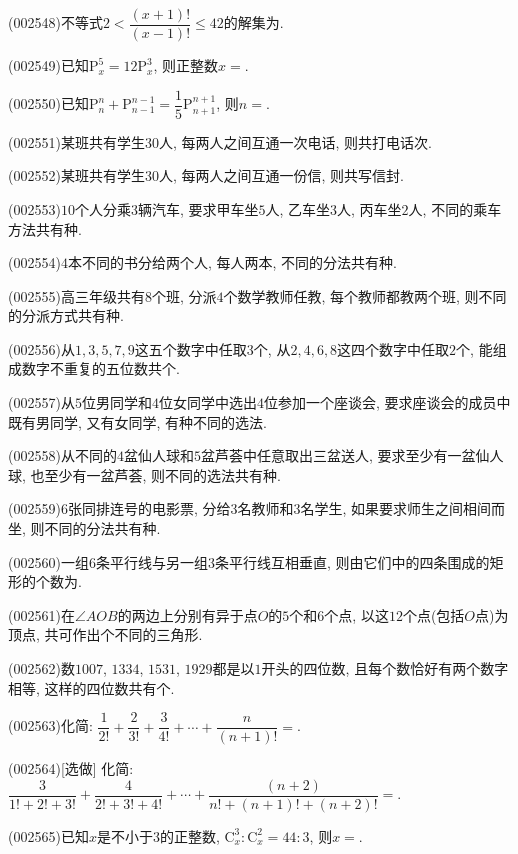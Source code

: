 \item (002548)不等式$2<\dfrac{(x+1)!}{(x-1)!}\le 42$的解集为.
\item (002549)已知$\mathrm{P}_x^5=12\mathrm{P}_x^3$, 则正整数$x=$.
\item (002550)已知$\mathrm{P}_n^n+\mathrm{P}_{n-1}^{n-1}=\dfrac{1}{5}\mathrm{P}_{n+1}^{n+1}$, 则$n=$.
\item (002551)某班共有学生$30$人, 每两人之间互通一次电话, 则共打电话次.
\item (002552)某班共有学生$30$人, 每两人之间互通一份信, 则共写信封.
\item (002553)$10$个人分乘$3$辆汽车, 要求甲车坐$5$人, 乙车坐$3$人, 丙车坐$2$人, 不同的乘车方法共有种.
\item (002554)$4$本不同的书分给两个人, 每人两本, 不同的分法共有种.
\item (002555)高三年级共有$8$个班, 分派$4$个数学教师任教, 每个教师都教两个班, 则不同的分派方式共有种.
\item (002556)从$1,3,5,7,9$这五个数字中任取$3$个, 从$2,4,6,8$这四个数字中任取$2$个, 能组成数字不重复的五位数共个.
\item (002557)从$5$位男同学和$4$位女同学中选出$4$位参加一个座谈会, 要求座谈会的成员中既有男同学, 又有女同学, 有种不同的选法.
\item (002558)从不同的$4$盆仙人球和$5$盆芦荟中任意取出三盆送人, 要求至少有一盆仙人球, 也至少有一盆芦荟, 则不同的选法共有种.
\item (002559)$6$张同排连号的电影票, 分给$3$名教师和$3$名学生, 如果要求师生之间相间而坐, 则不同的分法共有种.
\item (002560)一组$6$条平行线与另一组$3$条平行线互相垂直, 则由它们中的四条围成的矩形的个数为.
\item (002561)在$\angle AOB$的两边上分别有异于点$O$的$5$个和$6$个点, 以这$12$个点(包括$O$点)为顶点, 共可作出个不同的三角形.
\item (002562)数$1007$, $1334$, $1531$, $1929$都是以$1$开头的四位数, 且每个数恰好有两个数字相等, 这样的四位数共有个.
\item (002563)化简: $\dfrac{1}{2!}+\dfrac{2}{3!}+\dfrac{3}{4!}+\cdots+\dfrac{n}{(n+1)!}=$.
\item (002564)[选做]
化简: $\dfrac{3}{1!+2!+3!}+\dfrac{4}{2!+3!+4!}+\cdots+\dfrac{(n+2)}{n!+(n+1)!+(n+2)!}=$.
\item (002565)已知$x$是不小于$3$的正整数, $\mathrm{C}_x^3:\mathrm{C}_x^2=44:3$, 则$x=$.
